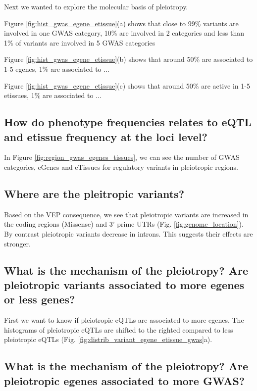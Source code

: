Next we wanted to explore the molecular basis of pleiotropy.

Figure \ref{fig:hist_gwas_egene_etissue}(a) shows that close to 99\% variants are involved in one GWAS category, 10\% are involved in 2 categories and less than 1\% of variants are involved in 5 GWAS categories

Figure \ref{fig:hist_gwas_egene_etissue}(b) shows that around 50\% are associated to 1-5 egenes, 1\% are associated to ...

Figure \ref{fig:hist_gwas_egene_etissue}(c) shows that around 50\% are active in 1-5 etissues, 1\% are associated to ...

\subsection*{How do phenotype frequencies relates to eQTL and etissue frequency at the loci level?}

In Figure \ref{fig:region_gwas_egenes_tissues}, we can see the number of GWAS categories, eGenes and eTissues for regulatory variants in pleiotropic regions.

\subsection*{Where are the pleitropic variants?}

Based on the VEP consequence, we see that pleiotropic variants are increased in the coding regions (Missense) and 3' prime UTRs (Fig. \ref{fig:genome_location}).
By contrast pleiotropic variants decrease in introns.
This suggests their effects are stronger.

\subsection*{What is the mechanism of the pleiotropy? Are pleiotropic variants associated to more egenes or less genes?}

First we want to know if pleiotropic eQTLs are associated to more egenes.
The histograms of pleiotropic eQTLs are shifted to the righted compared to less pleiotropic eQTLs (Fig. \ref{fig:distrib_variant_egene_etissue_gwas}a).

\subsection*{What is the mechanism of the pleiotropy? Are pleiotropic egenes associated to more GWAS?}

